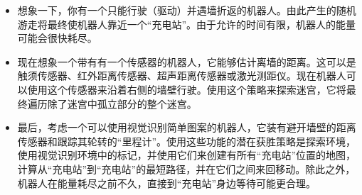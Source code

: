 
\begin{itemize}
\item 想象一下，你有一个只能行驶（驱动）并遇墙折返的机器人。由此产生的随机游走将最终使机器人靠近一个“充电站”。由于允许的时间有限，机器人的能量可能会很快耗尽。
\item 现在想象一个带有有一个传感器的机器人，它能够估计离墙的距离。这可以是触须传感器、红外距离传感器、超声距离传感器或激光测距仪。现在机器人可以使用这个传感器来沿着右侧的墙壁行驶。使用这个策略来探索迷宫，它将最终遍历除了迷宫中孤立部分的整个迷宫。
\item 最后，考虑一个可以使用视觉识别简单图案的机器人，它装有避开墙壁的距离传感器和跟踪其轮转的“里程计”。使用这些功能的潜在获胜策略是探索环境，使用视觉识别环境中的标记，并使用它们来创建有所有“充电站”位置的地图，计算从“充电站”到“充电站”的最短路径，并在它们之间来回移动。除此之外，机器人在能量耗尽之前不久，直接到“充电站”身边等待可能更合理。
\end{itemize}

